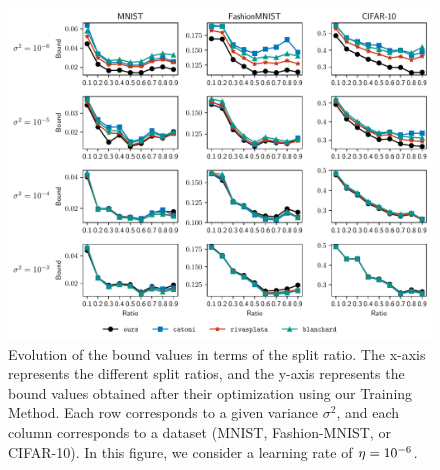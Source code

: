 \begin{figure}
    \centering
    \includegraphics[width=1.0\linewidth]{chapter_6/figures/plot_1_lr_1e-06.pdf}
    \caption[Evolution of the Bound Values in Terms of the Split Ratio (1/2)]{
    Evolution of the bound values in terms of the split ratio. 
    The \mbox{x-axis} represents the different split ratios, and the y-axis represents the bound values obtained after their optimization using our Training Method.
    Each row corresponds to a given variance $\sigma^2$, and each column corresponds to a dataset (MNIST, Fashion-MNIST, or CIFAR-10).
    In this figure, we consider a learning rate of $\eta=10^{-6}$.
    }
    \label{chap:dis-pra:figure:exp-4}
\end{figure}


